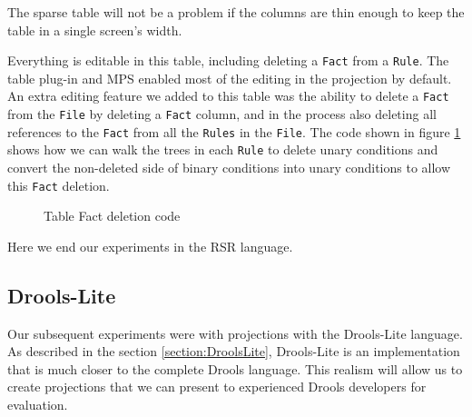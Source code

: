 The sparse table will not be a problem if the columns are thin enough to keep the table in a single screen's width.

Everything is editable in this table, including deleting a \texttt{Fact} from a \texttt{Rule}.
The table plug-in and MPS enabled most of the editing in the projection by default.
An extra editing feature we added to this table was the ability to delete a \texttt{Fact} from the \texttt{File} by deleting a \texttt{Fact} column, and in the process also deleting all references to the \texttt{Fact} from all the \texttt{Rules} in the \texttt{File}.
The code shown in figure \ref{fig:tableFactDeletion} shows how we can walk the trees in each \texttt{Rule} to delete unary conditions and convert the non-deleted side of binary conditions into unary conditions to allow this \texttt{Fact} deletion.

\begin{figure}[h]
    \centering
    \caption{Table Fact deletion code}
    \label{fig:tableFactDeletion}
\end{figure}

Here we end our experiments in the RSR language.

\subsection{Drools-Lite}

Our subsequent experiments were with projections with the Drools-Lite language.
As described in the section \ref{section:DroolsLite}, Drools-Lite is an implementation that is much closer to the complete Drools language.
This realism will allow us to create projections that we can present to experienced Drools developers for evaluation.

